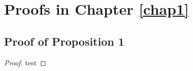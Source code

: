 

\section{Proofs in Chapter \ref{chap1}}

\label{Appendix2} %

\subsection{Proof of Proposition 1}
\begin{proof}
	test
\end{proof}
